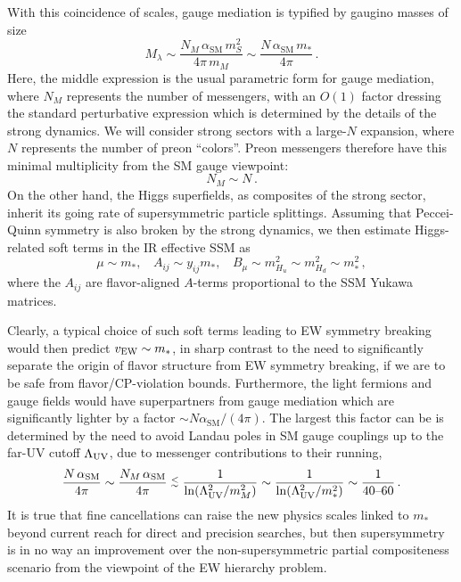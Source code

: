 \documentclass[a4paper,12pt]{article}
\newcommand{\lsim}{\stackrel{<}{_\sim}}
\def\LUV{\Lambda_{\rm UV}}
\def\mst{m_*}
\def\mS{m_S}
\begin{document}
With this coincidence of scales, gauge mediation is typified by gaugino masses of size
\begin{equation}
M_{\lambda} \sim \frac{N_M\, \alpha_{\textrm{SM}}\, \mS^2}{4 \pi\, m_M} \sim \frac{N\, \alpha_{\textrm{SM}}\, \mst}{4 \pi} \, .
\end{equation}
Here, the middle expression is the usual parametric form for gauge mediation, where $N_M$ represents the number of messengers,  with an $O(1)$ factor dressing the standard perturbative expression which is determined by the details of the strong dynamics. We will consider strong sectors with a large-$N$ expansion, where $N$ represents the number of preon ``colors''. Preon messengers therefore have this minimal multiplicity from the SM gauge viewpoint:
\begin{equation}
   N_M \sim N\, .
\end{equation}
On the other hand, the Higgs superfields, as composites of the strong sector, inherit its going rate of supersymmetric particle splittings. Assuming that Peccei-Quinn symmetry is also broken by the strong dynamics, we then estimate Higgs-related soft terms in the IR effective SSM as
\begin{equation}
\label{higgssoft}
   \mu \sim \mst, ~~~~ A_{ij} \sim y_{ij} \mst, ~~~~B_\mu \sim m_{H_u}^2 \sim m_{H_d}^2 \sim \mst^2\, ,
\end{equation}
where the $A_{ij}$ are flavor-aligned $A$-terms proportional to the SSM Yukawa matrices.

Clearly, a typical choice of such soft terms leading to EW symmetry breaking would then predict $v_{\rm EW} \sim \mst$, in sharp contrast to the need to significantly separate the origin of flavor structure from EW symmetry breaking, if we are to be safe from flavor/CP-violation bounds. Furthermore, the light fermions and gauge fields would have superpartners from gauge mediation which are significantly lighter by a factor $\sim N \alpha_{\textrm{SM}}/(4 \pi)$. The largest this factor can be is determined by the need to avoid Landau poles in SM gauge couplings up to the far-UV cutoff $\LUV$, due to messenger contributions to their running,
\begin{equation}
\frac{N\, \alpha_{\textrm{SM}}}{4 \pi} \sim \frac{N_M\, \alpha_{\textrm{SM}}}{4 \pi}
\lsim \frac{1}{ \ln(\LUV^2/m_M^2)} \sim \frac{1}{ \ln(\LUV^2/\mst^2)} \sim \frac{1}{40{\textrm {--}}60}\, .
\end{equation}
It is true that fine cancellations can raise the new physics scales linked to $\mst$ beyond current reach for direct and precision searches, but then supersymmetry is in no way an improvement over the non-supersymmetric partial compositeness scenario from the viewpoint of the EW hierarchy problem.
\end{document}
